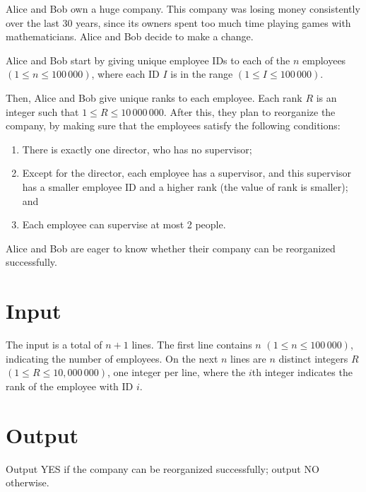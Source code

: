 Alice and Bob own a huge company. This company was losing money consistently over the last 30
years, since its owners spent too much time playing games with mathematicians. Alice and Bob
decide to make a change.

Alice and Bob start by giving unique employee IDs to each of the $n$ employees $(1 \le n \le 100\,000)$,
where each ID $I$ is in the range $(1 \le I \le 100\,000)$.

Then, Alice and Bob give unique ranks to each employee. Each rank $R$ is an integer such that
$1 \le R \le 10\,000\,000$. After this, they plan to reorganize the company, by making sure that the
employees satisfy the following conditions:
\begin{enumerate}
\item There is exactly one director, who has no supervisor;
\item Except for the director, each employee has a supervisor, and this supervisor has a smaller
employee ID and a higher rank (the value of rank is smaller); and
\item Each employee can supervise at most 2 people.
\end{enumerate}

Alice and Bob are eager to know whether their company can be reorganized successfully.

\section*{Input}
The input is a total of $n + 1$ lines. The first line contains $n$ $(1 \le n \le 100\,000)$,
indicating the number of employees. On the next $n$ lines are $n$ distinct integers $R$ $(1 \le R
\le 10, 000\,000)$, one integer per line, where the $i$th integer indicates the rank of the employee
with ID $i$.

\section*{Output}
Output YES if the company can be reorganized successfully; output NO otherwise.

